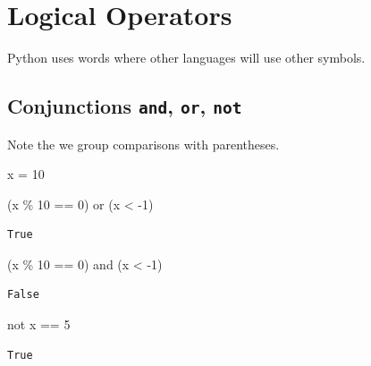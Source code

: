 \documentclass[
  letterpaper,
  DIV=11,
  numbers=noendperiod]{scrreprt}
\newenvironment{Shaded}{\begin{snugshade}}{\end{snugshade}}
\newcommand{\DecValTok}[1]{\textcolor[rgb]{0.68,0.00,0.00}{#1}}
\newcommand{\KeywordTok}[1]{\textcolor[rgb]{0.00,0.23,0.31}{#1}}
\newcommand{\NormalTok}[1]{\textcolor[rgb]{0.00,0.23,0.31}{#1}}
\newcommand{\OperatorTok}[1]{\textcolor[rgb]{0.37,0.37,0.37}{#1}}
\begin{document}
\hypertarget{logical-operators}{%
\section{Logical Operators}\label{logical-operators}}

Python uses words where other languages will use other symbols.

\hypertarget{conjunctions-and-or-not}{%
\subsection{\texorpdfstring{Conjunctions \texttt{and}, \texttt{or},
\texttt{not}}{Conjunctions and, or, not}}\label{conjunctions-and-or-not}}

Note the we group comparisons with parentheses.

\begin{Shaded}
\begin{Highlighting}[]
\NormalTok{x }\OperatorTok{=} \DecValTok{10}

\NormalTok{(x }\OperatorTok{\%} \DecValTok{10} \OperatorTok{==} \DecValTok{0}\NormalTok{) }\KeywordTok{or}\NormalTok{ (x }\OperatorTok{\textless{}} \OperatorTok{{-}}\DecValTok{1}\NormalTok{)}
\end{Highlighting}
\end{Shaded}

\begin{verbatim}
True
\end{verbatim}

\begin{Shaded}
\begin{Highlighting}[]
\NormalTok{(x }\OperatorTok{\%} \DecValTok{10} \OperatorTok{==} \DecValTok{0}\NormalTok{) }\KeywordTok{and}\NormalTok{ (x }\OperatorTok{\textless{}} \OperatorTok{{-}}\DecValTok{1}\NormalTok{)}
\end{Highlighting}
\end{Shaded}

\begin{verbatim}
False
\end{verbatim}

\begin{Shaded}
\begin{Highlighting}[]
\KeywordTok{not}\NormalTok{ x }\OperatorTok{==} \DecValTok{5}
\end{Highlighting}
\end{Shaded}

\begin{verbatim}
True
\end{verbatim}
\end{document}
